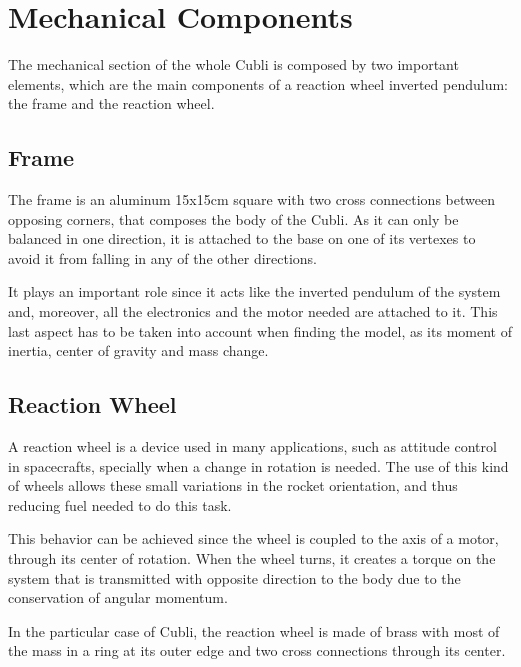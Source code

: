 \section{Mechanical Components}
The mechanical section of the whole Cubli is composed by two important elements, which are the main components of a reaction wheel inverted pendulum: the frame and the reaction wheel.

\subsection{Frame}
The frame is an aluminum 15x15cm square with two cross connections between opposing corners, that composes the body of the Cubli. As it can only be balanced in one direction, it is attached to the base on one of its vertexes to avoid it from falling in any of the other directions.

It plays an important role since it acts like the inverted pendulum of the system and, moreover, all the electronics and the motor needed are attached to it. This last aspect has to be taken into account when finding the model, as its moment of inertia, center of gravity and mass change.

\subsection{Reaction Wheel}
A reaction wheel is a device used in many applications, such as attitude control in spacecrafts, specially when a change in rotation is needed. The use of this kind of wheels allows these small variations in the rocket orientation, and thus reducing fuel needed to do this task.

 This behavior can be achieved since the wheel is coupled to the axis of a motor, through its center of rotation. When the wheel turns, it creates a torque on the system that is transmitted with opposite direction to the body due to the conservation of angular momentum.

In the particular case of Cubli, the reaction wheel is made of brass with most of the mass in a ring at its outer edge and two cross connections through its center.
